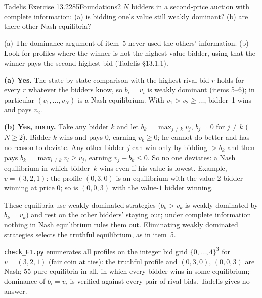 \begin{exsol}{Tadelis Exercise 13.2}{285}{Foundations}{2}
\asked $N$ bidders in a second-price auction with complete information: (a) is bidding one's value
still weakly dominant? (b) are there other Nash equilibria?

\method (a) The dominance argument of item~5 never used the others' information. (b) Look
for profiles where the winner is not the highest-value bidder, using that the winner pays the
second-highest bid (Tadelis \S13.1.1).

\solution
\textbf{(a) Yes.} The state-by-state comparison with the highest rival bid $r$ holds for every
$r$ whatever the bidders know, so $b_i=v_i$ is weakly dominant (items 5--6); in particular
$(v_1,\dots,v_N)$ is a Nash equilibrium. With $v_1>v_2\ge\dots$, bidder~1 wins and pays $v_2$.

\textbf{(b) Yes, many.} Take any bidder $k$ and let
$b_k=\max_{j\ne k}v_j$, $b_j=0$ for $j\ne k$ ($N\ge2$). Bidder $k$ wins and pays $0$, earning $v_k\ge0$;
he cannot do better and has no reason to deviate. Any other bidder $j$ can win only by bidding
$>b_k$ and then pays $b_k=\max_{l\ne k}v_l\ge v_j$, earning $v_j-b_k\le0$. So no one deviates:
a Nash equilibrium in which bidder~$k$ wins even if his value is lowest. Example, $v=(3,2,1)$: the
profile $(0,3,0)$ is an equilibrium with the value-$2$ bidder winning at price $0$; so is $(0,0,3)$
with the value-$1$ bidder winning.

\interp These equilibria use weakly dominated strategies ($b_k>v_k$ is weakly dominated by $b_k=v_k$)
and rest on the other bidders' staying out; under complete information nothing in Nash
equilibrium rules them out. Eliminating weakly dominated strategies selects the truthful
equilibrium, as in item~5.

\verify \texttt{check\_E1.py} enumerates all profiles on the integer bid grid $\{0,\dots,4\}^3$
for $v=(3,2,1)$ (fair coin at ties): the truthful profile and $(0,3,0)$, $(0,0,3)$ are Nash; 55
pure equilibria in all, in which every bidder wins in some equilibrium; dominance of
$b_i=v_i$ is verified against every pair of rival bids. Tadelis gives no answer.

\end{exsol}
